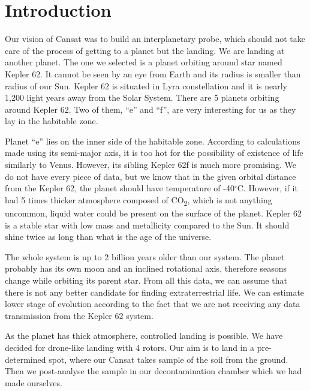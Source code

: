 \documentclass{cfp}
\begin{document}

   \maketitle
%

\section{Introduction}
\par Our vision of Cansat was to build an interplanetary probe, which should not take care of the process of getting to a planet but the landing. We are landing at another planet. The one we selected is a planet orbiting around star named Kepler 62. It cannot be seen by an eye from Earth and its radius is smaller than radius of our Sun. Kepler 62 is situated in Lyra constellation and it is nearly 1,200 light years away from the Solar System. There are 5 planets orbiting around Kepler 62. Two of them, “e” and “f”, are very interesting for us as they lay in the habitable zone.
\par Planet “e” lies on the inner side of the habitable zone. According to calculations made using its semi-major axis, it is too hot for the possibility of existence of life similarly to Venus. However, its sibling Kepler 62f is much more promising. We do not have every piece of data, but we know that in the given orbital distance from the Kepler 62, the planet should have temperature of -40$^\circ$C. However, if it had 5 times thicker atmosphere composed of CO\textsubscript{2}, which is not anything uncommon, liquid water could be present on the surface of the planet. Kepler 62 is a stable star with low mass and metallicity compared to the Sun. It should shine twice as long than what is the age of the universe.
\par The whole system is up to 2 billion years older than our system. The planet probably has its own moon and an inclined rotational axis, therefore seasons change while orbiting its parent star. From all this data, we can assume that there is not any better candidate for finding extraterrestrial life. We can estimate lower stage of evolution according to the fact that we are not receiving any data transmission from the Kepler 62 system.
\par As the planet has thick atmosphere, controlled landing is possible. We have decided for drone-like landing with 4 rotors. Our aim is to land in a pre-determined spot, where our Cansat takes sample of the soil from the ground. Then we post-analyse the sample in our decontamination chamber which we had made ourselves.
\end{document}
